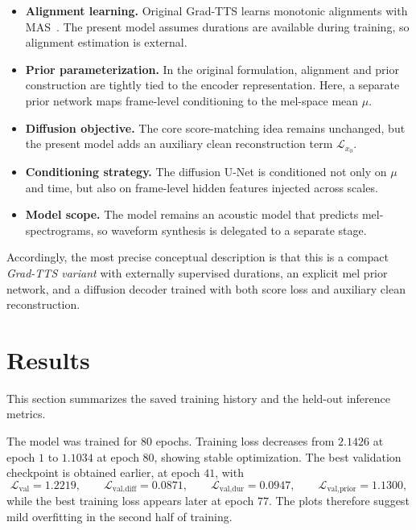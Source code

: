 \documentclass[11pt,a4paper]{article}
\begin{document}
\begin{itemize}
\item \textbf{Alignment learning.} Original Grad-TTS learns monotonic alignments with MAS~\cite{popov2021gradtts,kim2020glowtts}. The present model assumes durations are available during training, so alignment estimation is external.

\item \textbf{Prior parameterization.} In the original formulation, alignment and prior construction are tightly tied to the encoder representation. Here, a separate prior network maps frame-level conditioning to the mel-space mean $\mu$.

\item \textbf{Diffusion objective.} The core score-matching idea remains unchanged, but the present model adds an auxiliary clean reconstruction term $\mathcal{L}_{x_0}$.

\item \textbf{Conditioning strategy.} The diffusion U-Net is conditioned not only on $\mu$ and time, but also on frame-level hidden features injected across scales.

\item \textbf{Model scope.} The model remains an acoustic model that predicts mel-spectrograms, so waveform synthesis is delegated to a separate stage.
\end{itemize}

Accordingly, the most precise conceptual description is that this is a compact \emph{Grad-TTS variant} with externally supervised durations, an explicit mel prior network, and a diffusion decoder trained with both score loss and auxiliary clean reconstruction.

\section{Results}

This section summarizes the saved training history and the held-out inference metrics.

The model was trained for $80$ epochs. Training loss decreases from $2.1426$ at epoch $1$ to $1.1034$ at epoch $80$, showing stable optimization. The best validation checkpoint is obtained earlier, at epoch $41$, with
\[
\mathcal{L}_{\text{val}} = 1.2219,
\qquad
\mathcal{L}_{\text{val,diff}} = 0.0871,
\qquad
\mathcal{L}_{\text{val,dur}} = 0.0947,
\qquad
\mathcal{L}_{\text{val,prior}} = 1.1300,
\]
while the best training loss appears later at epoch $77$. The plots therefore suggest mild overfitting in the second half of training.
\end{document}

